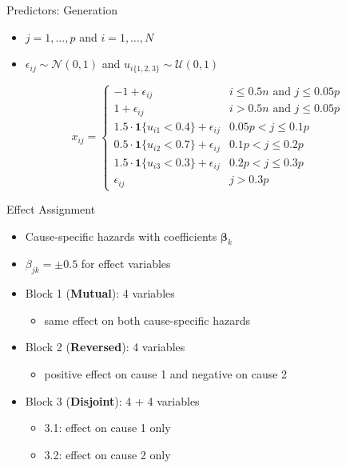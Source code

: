 \documentclass{beamer}
\providecommand{\tightlist}{%
  \setlength{\itemsep}{0pt}\setlength{\parskip}{0pt}}
\begin{document}
\begin{frame}{Predictors: Generation}
\protect\hypertarget{predictors-generation}{}
\begin{itemize}
\tightlist
\item
  \(j = 1, \ldots, p\) and \(i = 1, \ldots, N\)
\item
  \(\epsilon_{ij} \sim \mathcal{N}(0, 1)\) and
  \(u_{i\{1,2,3\}} \sim \mathcal{U}(0, 1)\)
\end{itemize}

\[
x_{ij} = \begin{cases}
-1 + \epsilon_{ij}                                   & i \leq 0.5n \text{ and } j \leq 0.05p \\
1 + \epsilon_{ij}                                    & i > 0.5n \text{ and } j \leq 0.05p \\
1.5 \cdot \mathbf{1}\{u_{i1} < 0.4\} + \epsilon_{ij} & 0.05p < j \leq 0.1p \\
0.5 \cdot \mathbf{1}\{u_{i2} < 0.7\} + \epsilon_{ij} & 0.1p < j \leq 0.2p \\
1.5 \cdot \mathbf{1}\{u_{i3} < 0.3\} + \epsilon_{ij} & 0.2p < j \leq 0.3p \\
\epsilon_{ij}                                        & j > 0.3p
\end{cases}
\]
\end{frame}

\begin{frame}{Effect Assignment}
\protect\hypertarget{effect-assignment}{}
\begin{itemize}
\item
  Cause-specific hazards with coefficients \(\boldsymbol{\beta}_k\)
\item
  \(\beta_{jk} = \pm 0.5\) for effect variables
\item
  Block 1 (\textbf{Mutual}): 4 variables

  \begin{itemize}
  \tightlist
  \item
    same effect on both cause-specific hazards
  \end{itemize}
\item
  Block 2 (\textbf{Reversed}): 4 variables

  \begin{itemize}
  \tightlist
  \item
    positive effect on cause 1 and negative on cause 2
  \end{itemize}
\item
  Block 3 (\textbf{Disjoint}): 4 + 4 variables

  \begin{itemize}
  \tightlist
  \item
    3.1: effect on cause 1 only
  \item
    3.2: effect on cause 2 only
  \end{itemize}
\end{itemize}
\end{frame}
\end{document}
